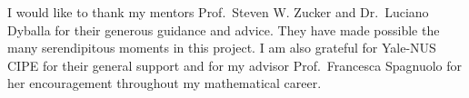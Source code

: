 \documentclass[
hidelinks,
12pt, %
oneside, %
english, %
doublespacing, %
headsepline, %
]{MastersDoctoralThesis} %
\author{\textsc{Zhang} Liu} %
\begin{document}
\frontmatter %

\pagestyle{plain} %


\begin{titlepage}


\end{titlepage}





\begin{acknowledgements}
\addchaptertocentry{\acknowledgementname} %
    I would like to thank my mentors Prof.~Steven W. Zucker and Dr.~Luciano Dyballa for their generous guidance and advice. They have made possible the many serendipitous moments in this project. I am also grateful for Yale-NUS CIPE for their general support and for my advisor Prof.~Francesca Spagnuolo for her encouragement throughout my mathematical career.
\end{acknowledgements}

\end{document}

